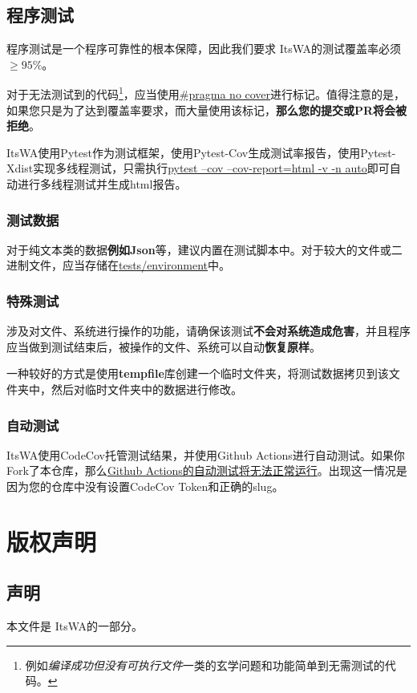 \documentclass[UTF8]{ctexart}
\newcommand{\itswa}{ItsWA}
\begin{document}
        \subsection{程序测试}
            程序测试是一个程序可靠性的根本保障，因此我们要求 \itswa 的测试覆盖率必须 $\geq 95\%$。

            对于无法测试到的代码\footnote{例如\textit{编译成功但没有可执行文件}一类的玄学问题和功能简单到无需测试的代码。}，应当使用\uline{\#pragma no cover}进行标记。值得注意的是，如果您只是为了达到覆盖率要求，而大量使用该标记，\textbf{那么您的提交或PR将会被拒绝}。

            \itswa 使用Pytest作为测试框架，使用Pytest-Cov生成测试率报告，使用Pytest-Xdist实现多线程测试，只需执行\uline{pytest --cov --cov-report=html -v -n auto}即可自动进行多线程测试并生成html报告。

            \subsubsection{测试数据}
                对于纯文本类的数据\textbf{例如Json}等，建议内置在测试脚本中。对于较大的文件或二进制文件，应当存储在\uline{tests/environment}中。

            \subsubsection{特殊测试}
                涉及对文件、系统进行操作的功能，请确保该测试\textbf{不会对系统造成危害}，并且程序应当做到测试结束后，被操作的文件、系统可以自动\textbf{恢复原样}。

                一种较好的方式是使用\textbf{tempfile}库创建一个临时文件夹，将测试数据拷贝到该文件夹中，然后对临时文件夹中的数据进行修改。

            \subsubsection{自动测试}
                \itswa 使用CodeCov托管测试结果，并使用Github Actions进行自动测试。如果你Fork了本仓库，那么\uline{Github Actions的自动测试将无法正常运行}。出现这一情况是因为您的仓库中没有设置CodeCov Token和正确的slug。
    
    \section{版权声明}
        \subsection{声明}
            本文件是 \itswa 的一部分。
\end{document}
